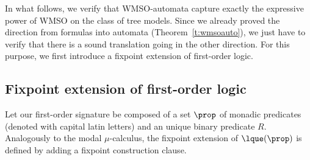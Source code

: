 

In what follows, we verify that WMSO-automata capture exactly the expressive power of WMSO on the class of tree models. Since we already proved the direction from formulas into automata (Theorem~\ref{t:wmsoauto}), we just have to verify that there is a sound translation going in the other direction.
For this purpose, we first introduce a fixpoint extension of first-order logic.

\subsection{Fixpoint extension of  first-order logic}

Let our first-order signature be composed of a set $\prop$ of monadic predicates (denoted with capital latin letters) and an unique binary predicate $R$.
%
%
%
%
Analogously to the modal $\mu$-calculus, the fixpoint extension of $\lque(\prop)$ is defined by adding a fixpoint construction clause.

